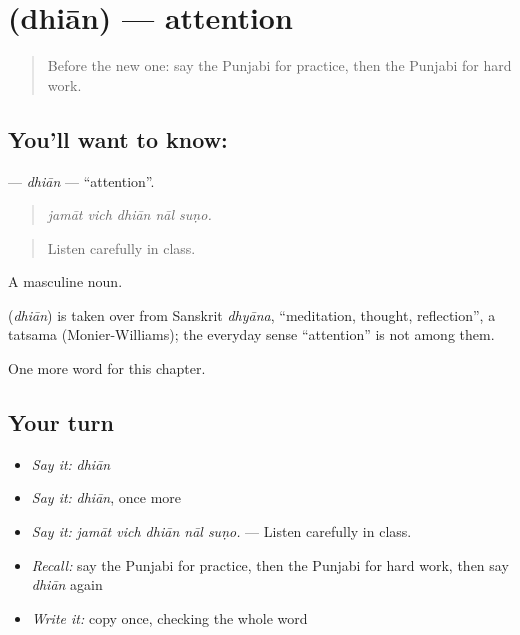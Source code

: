 \section[\texorpdfstring{\pa{ਧਿਆਨ} (dhiān)}{ਧਿਆਨ (dhiān)}]{ (dhiān) — attention}

\label{lesson:PA-C359-dhian}



\begin{quote}
Before the new one: say the Punjabi for practice, then the Punjabi for hard work.
\end{quote}

\subsection*{You'll want to know: }
\textbf{} — \emph{dhiān} — \textquotedblleft{}attention\textquotedblright{}.

\begin{quote}
    
\end{quote}

\begin{quote}
\emph{jamāt vich dhiān nāl suṇo.}
\end{quote}

\begin{quote}
Listen carefully in class.
\end{quote}

A masculine noun.

\begin{cousinweb}
\textbf{} (\emph{dhiān}) is taken over from Sanskrit \emph{dhyāna}, \textquotedblleft{}meditation, thought, reflection\textquotedblright{}, a tatsama (Monier-Williams); the everyday sense \textquotedblleft{}attention\textquotedblright{} is not among them.
\end{cousinweb}

\begin{grammarlens}[title={What you've built}]
One more word for this chapter.
\end{grammarlens}

\subsection*{Your turn}
\begin{itemize}
\raggedright
  \item \emph{Say it:} \emph{dhiān}
  \item \emph{Say it:} \emph{dhiān}, once more
  \item \emph{Say it:} \emph{jamāt vich dhiān nāl suṇo.} — Listen carefully in class.
  \item \emph{Recall:} say the Punjabi for practice, then the Punjabi for hard work, then say \emph{dhiān} again
  \item \emph{Write it:} copy \textbf{} once, checking the whole word
\end{itemize}


